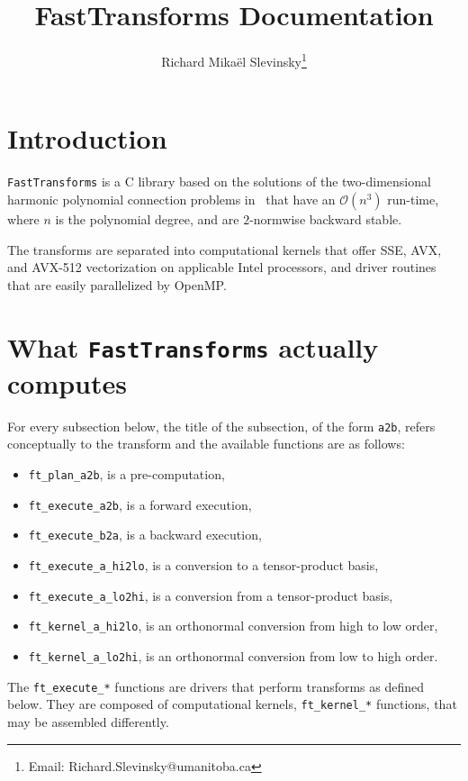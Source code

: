 \documentclass{article}
\begin{document}
\title{FastTransforms Documentation}

\author{Richard Mika\"el Slevinsky\thanks{Email: Richard.Slevinsky@umanitoba.ca}}

\date{}

\maketitle

\section{Introduction}

{\tt FastTransforms} is a C library based on the solutions of the two-dimensional harmonic polynomial connection problems in~\cite{Slevinsky-ACHA-17,Slevinsky-1711-07866} that have an $\mathcal{O}(n^3)$ run-time, where $n$ is the polynomial degree, and are $2$-normwise backward stable.

The transforms are separated into computational kernels that offer SSE, AVX, and AVX-512 vectorization on applicable Intel processors, and driver routines that are easily parallelized by OpenMP.

\section{What {\tt FastTransforms} actually computes}

For every subsection below, the title of the subsection, of the form \verb+a2b+, refers conceptually to the transform and the available functions are as follows:
\begin{itemize}
\item \verb+ft_plan_a2b+, is a pre-computation,
\item \verb+ft_execute_a2b+, is a forward execution,
\item \verb+ft_execute_b2a+, is a backward execution,
\item \verb+ft_execute_a_hi2lo+, is a conversion to a tensor-product basis,
\item \verb+ft_execute_a_lo2hi+, is a conversion from a tensor-product basis,
\item \verb+ft_kernel_a_hi2lo+, is an orthonormal conversion from high to low order,
\item \verb+ft_kernel_a_lo2hi+, is an orthonormal conversion from low to high order.
\end{itemize}
The \verb+ft_execute_*+ functions are drivers that perform transforms as defined below. They are composed of computational kernels, \verb+ft_kernel_*+ functions, that may be assembled differently.
\end{document}
